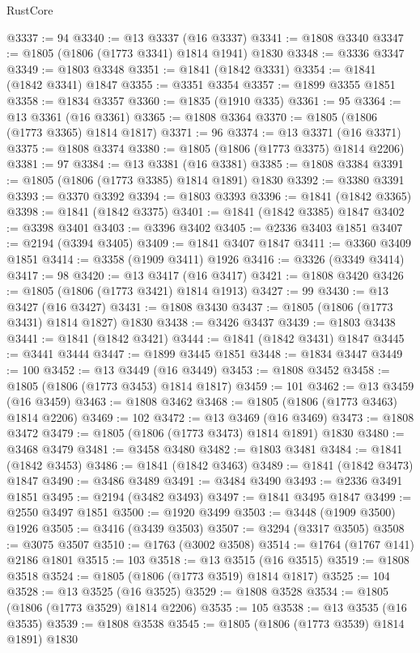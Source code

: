 \begin{lexlean}{RustCore}
\begin{coremodule}
@3337 := 94
@3340 := @13 @3337 (@16 @3337)
@3341 := @1808 @3340
@3347 := @1805 (@1806 (@1773 @3341) @1814 @1941) @1830
@3348 := @3336 @3347
@3349 := @1803 @3348
@3351 := @1841 (@1842 @3331)
@3354 := @1841 (@1842 @3341) @1847
@3355 := @3351 @3354
@3357 := @1899 @3355 @1851
@3358 := @1834 @3357
@3360 := @1835 (@1910 @335)
@3361 := 95
@3364 := @13 @3361 (@16 @3361)
@3365 := @1808 @3364
@3370 := @1805 (@1806 (@1773 @3365) @1814 @1817)
@3371 := 96
@3374 := @13 @3371 (@16 @3371)
@3375 := @1808 @3374
@3380 := @1805 (@1806 (@1773 @3375) @1814 @2206)
@3381 := 97
@3384 := @13 @3381 (@16 @3381)
@3385 := @1808 @3384
@3391 := @1805 (@1806 (@1773 @3385) @1814 @1891) @1830
@3392 := @3380 @3391
@3393 := @3370 @3392
@3394 := @1803 @3393
@3396 := @1841 (@1842 @3365)
@3398 := @1841 (@1842 @3375)
@3401 := @1841 (@1842 @3385) @1847
@3402 := @3398 @3401
@3403 := @3396 @3402
@3405 := @2336 @3403 @1851
@3407 := @2194 (@3394 @3405)
@3409 := @1841 @3407 @1847
@3411 := @3360 @3409 @1851
@3414 := @3358 (@1909 @3411) @1926
@3416 := @3326 (@3349 @3414)
@3417 := 98
@3420 := @13 @3417 (@16 @3417)
@3421 := @1808 @3420
@3426 := @1805 (@1806 (@1773 @3421) @1814 @1913)
@3427 := 99
@3430 := @13 @3427 (@16 @3427)
@3431 := @1808 @3430
@3437 := @1805 (@1806 (@1773 @3431) @1814 @1827) @1830
@3438 := @3426 @3437
@3439 := @1803 @3438
@3441 := @1841 (@1842 @3421)
@3444 := @1841 (@1842 @3431) @1847
@3445 := @3441 @3444
@3447 := @1899 @3445 @1851
@3448 := @1834 @3447
@3449 := 100
@3452 := @13 @3449 (@16 @3449)
@3453 := @1808 @3452
@3458 := @1805 (@1806 (@1773 @3453) @1814 @1817)
@3459 := 101
@3462 := @13 @3459 (@16 @3459)
@3463 := @1808 @3462
@3468 := @1805 (@1806 (@1773 @3463) @1814 @2206)
@3469 := 102
@3472 := @13 @3469 (@16 @3469)
@3473 := @1808 @3472
@3479 := @1805 (@1806 (@1773 @3473) @1814 @1891) @1830
@3480 := @3468 @3479
@3481 := @3458 @3480
@3482 := @1803 @3481
@3484 := @1841 (@1842 @3453)
@3486 := @1841 (@1842 @3463)
@3489 := @1841 (@1842 @3473) @1847
@3490 := @3486 @3489
@3491 := @3484 @3490
@3493 := @2336 @3491 @1851
@3495 := @2194 (@3482 @3493)
@3497 := @1841 @3495 @1847
@3499 := @2550 @3497 @1851
@3500 := @1920 @3499
@3503 := @3448 (@1909 @3500) @1926
@3505 := @3416 (@3439 @3503)
@3507 := @3294 (@3317 @3505)
@3508 := @3075 @3507
@3510 := @1763 (@3002 @3508)
@3514 := @1764 (@1767 @141) @2186 @1801
@3515 := 103
@3518 := @13 @3515 (@16 @3515)
@3519 := @1808 @3518
@3524 := @1805 (@1806 (@1773 @3519) @1814 @1817)
@3525 := 104
@3528 := @13 @3525 (@16 @3525)
@3529 := @1808 @3528
@3534 := @1805 (@1806 (@1773 @3529) @1814 @2206)
@3535 := 105
@3538 := @13 @3535 (@16 @3535)
@3539 := @1808 @3538
@3545 := @1805 (@1806 (@1773 @3539) @1814 @1891) @1830

\end{coremodule}
\end{lexlean}

